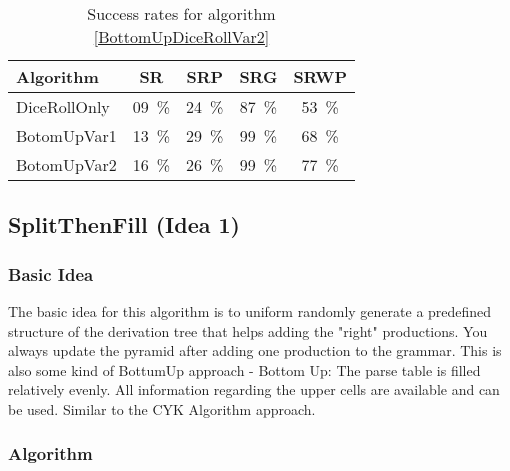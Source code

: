 \begin{table}[H]
	\centering
	\begin{tabular}{ | l || c |c |c |c | }
	\hline
	Algorithm 		& SR 	& SRP 	& SRG 	& SRWP   	\\ \hline
	\hline
	DiceRollOnly 	& 09~\%	& 24~\% & 87~\% & 53~\%		\\ \hline
	BotomUpVar1 	& 13~\% & 29~\% & 99~\% & 68~\% 	\\ \hline
	BotomUpVar2 	& 16~\% & 26~\% & 99~\% & 77~\% 	\\ \hline
	\end{tabular}
	\caption{Success rates for algorithm \ref{BottomUpDiceRollVar2}}
	\label{BottomUpDiceRollVar2SR}
\end{table}

\pagebreak
\subsection{SplitThenFill (Idea 1)}
\subsubsection{Basic Idea} 
The basic idea for this algorithm is to uniform randomly generate a predefined structure of the derivation tree that helps adding the "right" productions. You always update the pyramid after adding one production to the grammar.
This is also some kind of BottumUp approach - Bottom Up: The parse table is filled relatively evenly. All information regarding the upper cells are available and can be used. Similar to the CYK Algorithm approach.
\subsubsection{Algorithm}
\noindent
{}
\\

